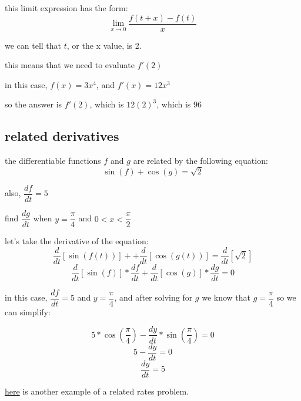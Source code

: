 \documentclass[11pt,a4paper]{article}
\begin{document}
this limit expression has the form:
$$\lim \limits_{x \to 0}\dfrac{f(t+x)-f(t)}{x}$$

we can tell that $t$, or the x value, is 2.

this means that we need to evaluate $f'(2)$

in this case, $f(x)=3x^4$, and $f'(x)=12x^3$

so the answer is $f'(2)$, which is $12(2)^3$, which is $96$

\subsection{related derivatives}

the differentiable functions $f$ and $g$ are related by the following equation:
$$\sin(f)+\cos(g)=\sqrt{2}$$

also, $\dfrac{df}{dt}=5$

find $\dfrac{dg}{dt}$ when $y=\dfrac{\pi}{4}$ and $0<x<\dfrac{\pi}{2}$

let's take the derivative of the equation:
$$\dfrac{d}{dt}\left[\sin(f(t))\right]++\dfrac{d}{dt}\left[\cos(g(t))\right]=\dfrac{d}{dt}\left[\sqrt{2}\right]$$
$$\dfrac{d}{dt}\left[\sin(f)\right]*\dfrac{df}{dt}+\dfrac{d}{dt}\left[\cos(g)\right]*\dfrac{dg}{dt}=0$$

in this case, $\dfrac{df}{dt}=5$ and $y=\dfrac{\pi}{4}$, and after solving for $g$ we know that $g=\dfrac{\pi}{4}$ so we can simplify:

$$5*\cos(\dfrac{\pi}{4})-\dfrac{dy}{dt}*\sin(\dfrac{\pi}{4})=0$$
$$5-\dfrac{dy}{dt}=0$$
$$\dfrac{dy}{dt}=5$$


\href{https://www.khanacademy.org/math/ap-calculus-ab/ab-diff-contextual-applications-new/ab-4-5/v/falling-ladder-related-rates}{here} is another example of a related rates problem.
\end{document}
